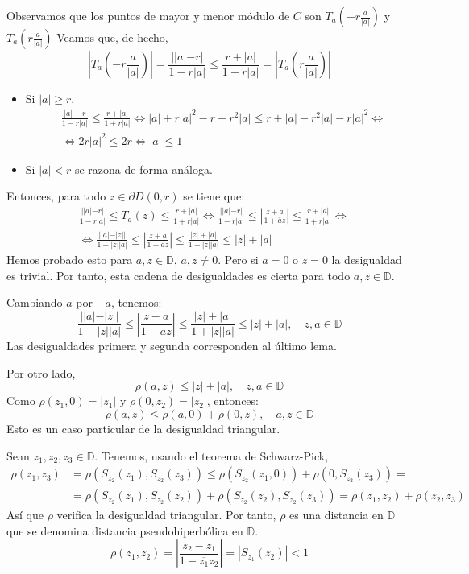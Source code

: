 Observamos que los puntos de mayor y menor módulo de $C$ son $T_a\left(-r\frac{a}{|a|}\right)$ y $T_a\left(r\frac{a}{|a|}\right)$
Veamos que, de hecho,
$$\left|T_a\left(-r\frac{a}{|a|}\right)\right| = \frac{||a|-r|}{1-r|a|} \leq \frac{r+|a|}{1+r|a|} = \left|T_a\left(r\frac{a}{|a|}\right)\right|$$
\begin{itemize}
    \item Si $|a| \geq r$,
          \begin{align*}
               & \frac{|a|-r}{1-r|a|} \leq \frac{r+|a|}{1+r|a|} \Leftrightarrow |a| + r|a|^2 - r - r^2|a| \leq r + |a| - r^2|a| - r|a|^2 \Leftrightarrow \\
               & \Leftrightarrow 2r|a|^2 \leq 2r \Leftrightarrow |a| \leq 1
          \end{align*}
    \item Si $|a| < r$ se razona de forma análoga.
\end{itemize}

Entonces, para todo $z \in \partial D(0, r)$ se tiene que:
\begin{align*}
     & \frac{||a|-r|}{1-r|a|} \leq T_a(z) \leq \frac{r+|a|}{1+r|a|} \Leftrightarrow \frac{||a|-r|}{1-r|a|} \leq \left|\frac{z+a}{1+\bar{a}z}\right| \leq \frac{r+|a|}{1+r|a|} \Leftrightarrow \\
     & \Leftrightarrow \frac{||a|-|z||}{1-|z||a|} \leq \left|\frac{z+a}{1+\bar{a}z}\right| \leq \frac{|z|+|a|}{1+|z||a|} \leq |z|+|a|
\end{align*}
Hemos probado esto para $a, z \in \mathbb{D}$, $a, z \neq 0$.
Pero si $a = 0$ o $z = 0$ la desigualdad es trivial.
Por tanto, esta cadena de desigualdades es cierta para todo $a, z \in \mathbb{D}$.

Cambiando $a$ por $-a$, tenemos:
$$\frac{||a|-|z||}{1-|z||a|} \leq \left|\frac{z-a}{1-\bar{a}z}\right| \leq \frac{|z|+|a|}{1+|z||a|} \leq |z|+|a|, \quad z, a \in \mathbb{D}$$
Las desigualdades primera y segunda corresponden al último lema.

Por otro lado,
$$\rho(a, z) \leq |z| + |a|, \quad z, a \in \mathbb{D}$$
Como $\rho(z_1, 0) = |z_1|$ y $\rho(0, z_2) = |z_2|$, entonces:
$$\rho(a, z) \leq \rho(a, 0) + \rho(0, z), \quad a, z \in \mathbb{D}$$
Esto es un caso particular de la desigualdad triangular.

Sean $z_1, z_2, z_3 \in \mathbb{D}$.
Tenemos, usando el teorema de Schwarz-Pick,
\begin{align*}
    \rho(z_1, z_3) & = \rho(S_{z_2}(z_1), S_{z_2}(z_3)) \leq \rho(S_{z_2}(z_1, 0)) + \rho(0, S_{z_2}(z_3)) =                 \\
                   & = \rho(S_{z_2}(z_1), S_{z_2}(z_2)) + \rho(S_{z_2}(z_2), S_{z_2}(z_3)) = \rho(z_1, z_2) + \rho(z_2, z_3)
\end{align*}
Así que $\rho$ verifica la desigualdad triangular.
Por tanto, $\rho$ es una distancia en $\mathbb{D}$ que se denomina distancia pseudohiperbólica en $\mathbb{D}$.
$$\rho(z_1, z_2) = \left|\frac{z_2-z_1}{1-\overline{z_1}z_2}\right| = |S_{z_1}(z_2)| < 1$$

